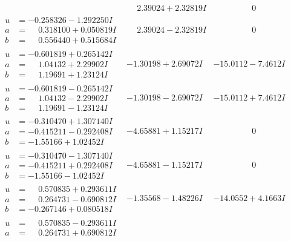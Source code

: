 \documentclass[1p]{elsarticle_modified}
\theoremstyle{definition}
\begin{document}
$$\begin{array}{c|c|c}
 & \phantom{-}2.39024 + 2.32819 I & \phantom{-0.000000 } 0 \\ \hline\begin{aligned}
u &= -0.258326 - 1.292250 I \\
a &= \phantom{-}0.318100 + 0.050819 I \\
b &= \phantom{-}0.556440 + 0.515684 I\end{aligned}
 & \phantom{-}2.39024 - 2.32819 I & \phantom{-0.000000 } 0 \\ \hline\begin{aligned}
u &= -0.601819 + 0.265142 I \\
a &= \phantom{-}1.04132 + 2.29902 I \\
b &= \phantom{-}1.19691 + 1.23124 I\end{aligned}
 & -1.30198 + 2.69072 I & -15.0112 - 7.4612 I \\ \hline\begin{aligned}
u &= -0.601819 - 0.265142 I \\
a &= \phantom{-}1.04132 - 2.29902 I \\
b &= \phantom{-}1.19691 - 1.23124 I\end{aligned}
 & -1.30198 - 2.69072 I & -15.0112 + 7.4612 I \\ \hline\begin{aligned}
u &= -0.310470 + 1.307140 I \\
a &= -0.415211 - 0.292408 I \\
b &= -1.55166 + 1.02452 I\end{aligned}
 & -4.65881 + 1.15217 I & \phantom{-0.000000 } 0 \\ \hline\begin{aligned}
u &= -0.310470 - 1.307140 I \\
a &= -0.415211 + 0.292408 I \\
b &= -1.55166 - 1.02452 I\end{aligned}
 & -4.65881 - 1.15217 I & \phantom{-0.000000 } 0 \\ \hline\begin{aligned}
u &= \phantom{-}0.570835 + 0.293611 I \\
a &= \phantom{-}0.264731 - 0.690812 I \\
b &= -0.267146 + 0.080518 I\end{aligned}
 & -1.35568 - 1.48226 I & -14.0552 + 4.1663 I \\ \hline\begin{aligned}
u &= \phantom{-}0.570835 - 0.293611 I \\
a &= \phantom{-}0.264731 + 0.690812 I \\

\end{aligned}
\end{array}$$
\end{document}
